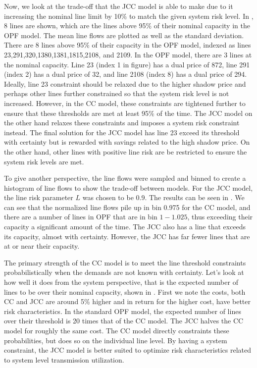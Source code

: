 Now, we look at the trade-off that the JCC model is able to make due to it increasing the nominal line limit by 10\% to match the given system risk level.  In  , 8 lines are shown, which are the lines above 95\% of their nominal capacity in the OPF model.  The mean line flows are plotted as well as the standard deviation.   There are 8 lines above 95\% of their capacity in the OPF model, indexed as lines 23,291,320,1380,1381,1815,2108, and 2109. In the OPF model, there are 3 lines at the nominal capacity.  Line 23 (index 1 in figure) has a dual price of 872, line 291 (index 2) has a dual price of 32, and line 2108 (index 8) has a dual price of 294.  Ideally, line 23 constraint should be relaxed due to the higher shadow price and perhaps other lines further constrained so that the system risk level is not increased. However, in the CC model, these constraints are tightened further to ensure that these thresholds are met at least 95\% of the time.  The JCC model on the other hand relaxes these constraints and imposes a system risk constraint instead.  The final solution for the JCC model has line 23 exceed its threshold with certainty but is rewarded with savings related to the high shadow price.  On the other hand, other lines with positive line risk are be restricted to ensure the system risk levels are met.

To give another perspective, the line flows were sampled and binned to create a histogram of line flows to show the trade-off between models.  For the JCC model, the line risk parameter $L$ was chosen to be 0.9.  The results can be seen in .  We can see that the normalized line flows pile up in bin 0.975 for the CC model, and there are a number of lines in OPF that are in bin $1-1.025$, thus exceeding their capacity a significant amount of the time.  The JCC also has a line that exceeds its capacity, almost with certainty.  However, the JCC has far fewer lines that are at or near their capacity.



The primary strength of the CC model is to meet the line threshold constraints probabilistically when the demands are not known with certainty.  Let's look at how well it does from the system perspective, that is the expected number of lines to be over their nominal capacity, shown in .  First we note the costs, both CC and JCC are around 5\% higher and in return for the higher cost, have better risk characteristics.  In the standard OPF model, the expected number of lines over their threshold is 20 times that of the CC model.  The JCC halves the CC model for roughly the same cost.  The CC model directly constraints these probabilities, but does so on the individual line level.  By having a system constraint, the JCC model is better suited to optimize risk characteristics related to system level transmission utilization.


